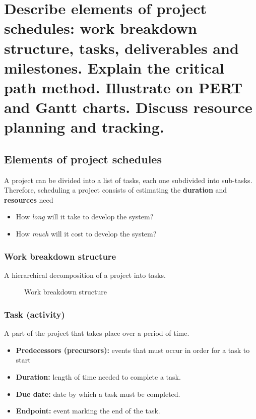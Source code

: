 \clearpage{}

\section{Describe elements of project schedules: work breakdown structure,
tasks, deliverables and milestones. Explain the critical path method.
Illustrate on PERT and Gantt charts. Discuss resource planning and
tracking.}

\subsection{Elements of project schedules}

A project can be divided into a list of tasks, each one subdivided into
sub-tasks. Therefore, scheduling a project consists of estimating the
\textbf{duration} and \textbf{resources} need

\begin{itemize}
	\item How \textit{long} will it take to develop the system?
	\item How \textit{much} will it cost to develop the system?
\end{itemize}

\subsubsection{Work breakdown structure}
A hierarchical decomposition of a project into tasks.
\begin{figure}[!ht]
    \centering
    
    \caption{Work breakdown structure}
\end{figure}

\subsubsection{Task (activity)}
A part of the project that takes place over a period of time.
\begin{itemize}
    \item \textbf{Predecessors (precursors):} events that must occur in order for a
    task to start
    \item \textbf{Duration:} length of time needed to complete a task.
    \item \textbf{Due date:} date by which a task must be completed.
    \item \textbf{Endpoint:} event marking the end of the task.
\end{itemize}


